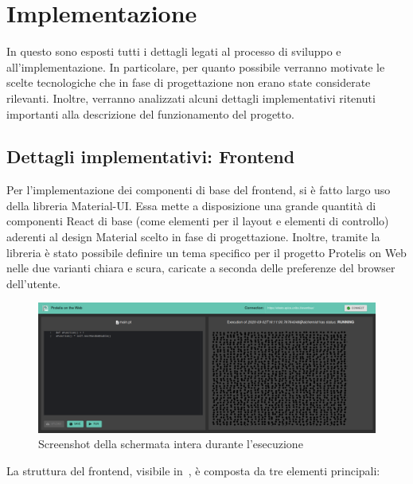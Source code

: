 \chapter{Implementazione}\label{ch:implementation}
  In questo  sono esposti tutti i dettagli legati al processo di sviluppo e all'implementazione.
  In particolare, per quanto possibile verranno motivate le scelte tecnologiche che in fase di progettazione non erano state considerate rilevanti.
  Inoltre, verranno analizzati alcuni dettagli implementativi ritenuti importanti alla descrizione del funzionamento del progetto.

  

  \section{Dettagli implementativi: Frontend}

    Per l'implementazione dei componenti di base del frontend, si è fatto largo uso della libreria Material-UI\@.
    Essa mette a disposizione una grande quantità di componenti React di base (come elementi per il layout e elementi di controllo) aderenti al design Material scelto in fase di progettazione.
    Inoltre, tramite la libreria è stato possibile definire un tema specifico per il progetto Protelis on Web nelle due varianti chiara e scura, caricate a seconda delle preferenze del browser dell'utente.

    \begin{figure}[htbp]
      \centering
      \includegraphics[width=\textwidth]{res/screenshot/Screenshot_2020-03-02 Protelis on the Web(6).png} %
      \caption{Screenshot della schermata intera durante l'esecuzione}%
      \label{fig:screenshot:all}
    \end{figure}

    La struttura del frontend, visibile in~, è composta da tre elementi principali:


